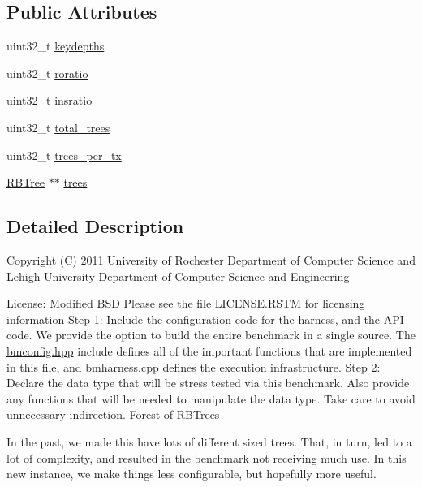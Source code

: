 \subsection*{Public Attributes}
\begin{DoxyCompactItemize}
\item 
uint32\-\_\-t \hyperlink{structCustomForest_a4fb358056d0c2b9959d025bbb91d3bf1}{keydepths}
\item 
uint32\-\_\-t \hyperlink{structCustomForest_ae8739de035eeb4214ac1861ad3453405}{roratio}
\item 
uint32\-\_\-t \hyperlink{structCustomForest_a8011fa27621e3a81f4f614ac718370b0}{insratio}
\item 
uint32\-\_\-t \hyperlink{structCustomForest_a2a68926260c0bcc10b91127362897e87}{total\-\_\-trees}
\item 
uint32\-\_\-t \hyperlink{structCustomForest_a2f890aea4e4375743240e33ba940e0d6}{trees\-\_\-per\-\_\-tx}
\item 
\hyperlink{classRBTree}{R\-B\-Tree} $\ast$$\ast$ \hyperlink{structCustomForest_a473d09bb83cd583577c8a99247fac849}{trees}
\end{DoxyCompactItemize}


\subsection{Detailed Description}
Copyright (C) 2011 University of Rochester Department of Computer Science and Lehigh University Department of Computer Science and Engineering

License\-: Modified B\-S\-D Please see the file L\-I\-C\-E\-N\-S\-E.\-R\-S\-T\-M for licensing information Step 1\-: Include the configuration code for the harness, and the A\-P\-I code. We provide the option to build the entire benchmark in a single source. The \hyperlink{bmconfig_8hpp}{bmconfig.\-hpp} include defines all of the important functions that are implemented in this file, and \hyperlink{bmharness_8cpp}{bmharness.\-cpp} defines the execution infrastructure. Step 2\-: Declare the data type that will be stress tested via this benchmark. Also provide any functions that will be needed to manipulate the data type. Take care to avoid unnecessary indirection. Forest of R\-B\-Trees

In the past, we made this have lots of different sized trees. That, in turn, led to a lot of complexity, and resulted in the benchmark not receiving much use. In this new instance, we make things less configurable, but hopefully more useful.

